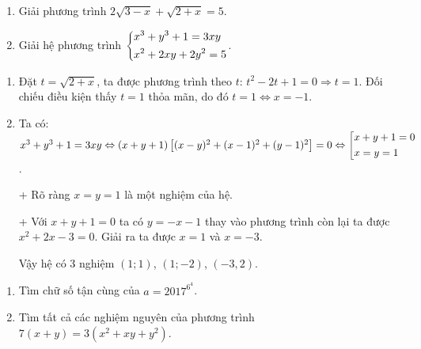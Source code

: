 \begin{ex}%
    \hfill
    \begin{enumerate}
        \item Giải phương trình $2\sqrt{3-x}+\sqrt{2+x}=5$.
        \item Giải hệ phương trình $\left\{\begin{aligned}&x^3+y^3+1=3xy\\&x^2+2xy+2y^2=5\end{aligned}\right.$.
    \end{enumerate}
\loigiai
    {
    \begin{enumerate}
        \item Đặt $t=\sqrt{2+x}$, ta được phương trình theo $t$: $t^2-2t+1=0\Rightarrow t=1$. Đối chiếu điều kiện thấy $t=1$ thỏa mãn, do đó $t=1\Leftrightarrow x=-1$.
        \item Ta có: $x^3+y^3+1=3xy\Leftrightarrow \left(x+y+1\right)\left[(x-y)^2+(x-1)^2+(y-1)^2\right]=0\Leftrightarrow\left[\begin{aligned}&x+y+1=0\\&x=y=1\end{aligned}\right.$.
        
        + Rõ ràng $x=y=1$ là một nghiệm của hệ.
        
        + Với $x+y+1=0$ ta có $y=-x-1$ thay vào phương trình còn lại ta được $x^2+2x-3=0.$ Giải ra ta được $x=1$ và $x=-3$. 
        
        Vậy hệ có 3 nghiệm $(1;1)$, $(1;-2)$, $(-3,2)$.
    \end{enumerate}
    }
\end{ex}
\begin{ex}%
	\hfill
	\begin{enumerate}
		\item Tìm chữ số tận cùng của $a=2017^{6^4}$.
		\item Tìm tất cả các nghiệm nguyên của phương trình $7\left(x+y\right)=3\left(x^2+xy+y^2\right)$.
	\end{enumerate}
\end{ex}
